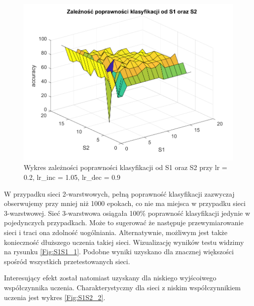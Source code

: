 \documentclass[12pt,twoside]{article}
\begin{document}
\begin{figure}[ht]
	\centering
	\includegraphics[width=16cm]{figures/S1S2_1.png}
	\caption{Wykres zależności poprawności klasyfikacji od S1 oraz S2 przy lr = 0.2, lr\_inc = 1.05, lr\_dec = 0.9}
	\label{Fig:S1S2_1}
\end{figure}

W przypadku sieci 2-warstwowych, pełną poprawność klasyfikacji zazwyczaj obserwujemy przy mniej niż 1000 epokach, co nie ma miejsca w przypadku sieci 3-warstwowej.
Sieć 3-warstwowa osiągała 100\% poprawność klasyfikacji jedynie w pojedynczych przypadkach.
Może to sugerować że następuje przewymiarowanie sieci i traci ona zdolność uogólniania.
Alternatywnie, możliwym jest także konieczność dłuższego uczenia takiej sieci.
Wizualizację wyników testu widzimy na rysunku \ref{Fig:S1S1_1}.
Podobne wyniki uzyskano dla znacznej większości spośród wszystkich przetestowanych sieci.

Interesujący efekt został natomiast uzyskany dla niskiego wyjścoiwego współczynnika uczenia.
Charakterystyczny dla sieci z niskim współczynnikiem uczenia jest wykres \ref{Fig:S1S2_2}.
\end{document}
